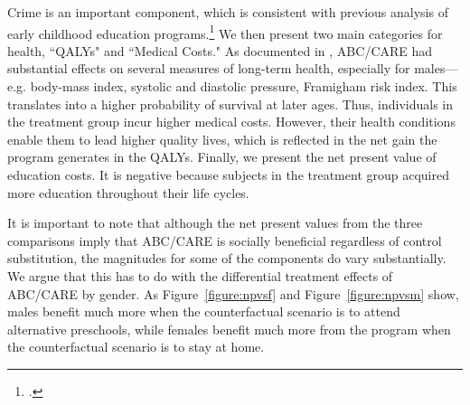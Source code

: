 Crime is an important component, which is consistent with previous analysis of early childhood education programs.\footnote{\citet{Heckman_Moon_etal_2010_RateofReturn}.} We then present two main categories for health, ``QALYs" and ``Medical Costs." As documented in \citet{Campbell_Conti_etal_2014_EarlyChildhoodInvestments}, ABC/CARE had substantial effects on several measures of long-term health, especially for males---e.g. body-mass index, systolic and diastolic pressure, Framigham risk index. This translates into a higher probability of survival at later ages. Thus, individuals in the treatment group incur higher medical costs. However, their health conditions enable them to lead higher quality lives, which is reflected in the net gain the program generates in the QALYs. Finally, we present the net present value of education costs. It is negative because subjects in the treatment group acquired more education throughout their life cycles. 

It is important to note that although the net present values from the three comparisons imply that ABC/CARE is socially beneficial regardless of control substitution, the magnitudes for some of the components do vary substantially. We argue that this has to do with the differential treatment effects of ABC/CARE by gender. As Figure~\ref{figure:npvsf} and Figure~\ref{figure:npvsm} show, males benefit much more when the counterfactual scenario is to attend alternative preschools, while females benefit much more from the program when the counterfactual scenario is to stay at home.

